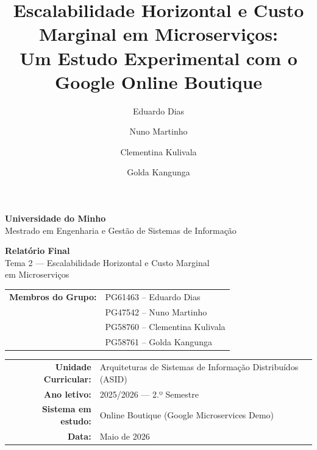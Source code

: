\documentclass[acmsmall,screen=true,nonacm]{acmart}
\author{Eduardo Dias}
\affiliation{\institution{Universidade do Minho}\country{Portugal}}
\author{Nuno Martinho}
\affiliation{\institution{Universidade do Minho}\country{Portugal}}
\author{Clementina Kulivala}
\affiliation{\institution{Universidade do Minho}\country{Portugal}}
\author{Golda Kangunga}
\affiliation{\institution{Universidade do Minho}\country{Portugal}}
\title{Escalabilidade Horizontal e Custo Marginal em Microserviços:\\
Um Estudo Experimental com o Google Online Boutique}
\begin{document}
\begin{titlepage}
\thispagestyle{empty}
\begin{center}
\vspace*{1.5cm}

{\large \textbf{Universidade do Minho}}\\[0.3cm]
{\normalsize Mestrado em Engenharia e Gestão de Sistemas de Informação}

\vspace{2.5cm}

{\LARGE \textbf{Relatório Final}}\\[0.6cm]
{\large Tema 2 — Escalabilidade Horizontal e Custo Marginal\\[0.2cm]
em Microserviços}

\vspace{2.5cm}

\begin{tabular}{rl}
\textbf{Membros do Grupo:} & PG61463 – Eduardo Dias \\[0.2cm]
 & PG47542 – Nuno Martinho \\[0.2cm]
 & PG58760 – Clementina Kulivala \\[0.2cm]
 & PG58761 – Golda Kangunga \\
\end{tabular}

\vspace{2cm}

\begin{tabular}{rl}
\textbf{Unidade Curricular:} & Arquiteturas de Sistemas de Informação Distribuídos (ASID) \\[0.2cm]
\textbf{Ano letivo:} & 2025/2026 — 2.º Semestre \\[0.2cm]
\textbf{Sistema em estudo:} & Online Boutique (Google Microservices Demo) \\[0.2cm]
\textbf{Data:} & Maio de 2026 \\
\end{tabular}

\end{center}
\end{titlepage}

\maketitle
\end{document}
